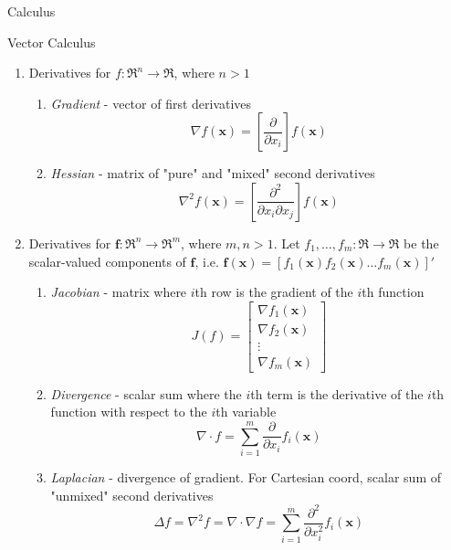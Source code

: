 \documentclass{article}
\begin{document}
\begin{section}{Calculus}
\begin{subsection}{Vector Calculus}
\begin{enumerate}
\item Derivatives for $f : \Re^n \to \Re$, where $n > 1$
    \begin{enumerate}
    \item \emph{Gradient} - vector of first derivatives
    \[ \nabla f(\mathbf{x}) = \left[ \frac{\partial}{\partial x_i} \right] 
           f(\mathbf{x}) \]
    \item \emph{Hessian} - matrix of "pure" and "mixed" second derivatives
          \[ \nabla^2 f(\mathbf{x}) = 
            \left[\frac{\partial^2}{\partial x_{i} \partial x_{j}}\right] 
            f(\mathbf{x}) \]
    \end{enumerate}
\item Derivatives for $\mathbf{f} : \Re^n \to \Re^m$, where $m, n > 1$. Let 
      $f_1, \ldots, f_m : \Re \to \Re$ be the scalar-valued components of 
      $\mathbf{f}$, i.e.
      $\mathbf{f}(\mathbf{x}) = [f_1(\mathbf{x}) f_2(\mathbf{x}) \ldots
        f_m(\mathbf{x})]'$
    \begin{enumerate}
    \item \emph{Jacobian} - matrix where $i$th row is the gradient of the 
          $i$th function
          \[ J(f) = \begin{bmatrix}
                    \nabla f_1(\mathbf{x}) \\
                    \nabla f_2(\mathbf{x}) \\
                    \vdots \\
                    \nabla f_m(\mathbf{x})
                    \end{bmatrix} \]
    \item \emph{Divergence} - scalar sum where the $i$th term is the 
          derivative of the $i$th function with respect to the $i$th variable
          \[ \nabla \cdot f = \sum_{i=1}^m \frac{\partial}{\partial x_i}
             f_i(\mathbf{x}) \]
    \item \emph{Laplacian} - divergence of gradient. For Cartesian coord,
       scalar sum of "unmixed" second derivatives
        \[ \Delta f = \nabla^2 f = \nabla \cdot \nabla f = \sum_{i=1}^m
           \frac{\partial^2}{\partial x_i^2} f_i(\mathbf{x}) \]
    \end{enumerate}
\end{enumerate}
\end{subsection}
\end{section}
\end{document}

